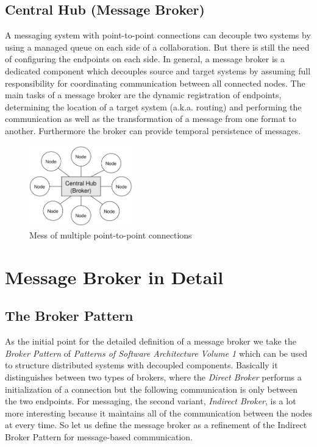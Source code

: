 \subsection{Central Hub (Message Broker)}
\label{intro-messaging-broker}
A messaging system with point-to-point connections can decouple two systems
by using a managed queue on each side of a collaboration. But there is
still the need of configuring the endpoints on each side. In general, a
message broker is a dedicated component which decouples source and
target systems by assuming full responsibility for coordinating communication between
all connected nodes. The main tasks of a message broker are the
dynamic registration of endpoints, determining the location of a target system
(a.k.a. routing) and performing the communication as well as the transformation of a
message from one format to another. Furthermore the broker can provide temporal
persistence of messages. \cite{MSDNIntegration} \\

\begin{figure}[H]
    \centering
    \includegraphics[width=0.4\textwidth]{images/central-hub.png}
    \caption{Mess of multiple point-to-point connections}
    \label{fig:central-hub}
\end{figure}


\section{Message Broker in Detail}
\subsection{The Broker Pattern }
As the initial point for the detailed definition of a message broker we take the
\textit{Broker Pattern} of  \textit{Patterns of Software Architecture Volume 1}
which can be used to structure distributed systems with decoupled components.
Basically it distinguishes between two types of brokers, where the \textit{Direct
Broker} performs a initialization of a connection but the following communication
is only between the two endpoints. For messaging, the second variant,
\textit{Indirect Broker}, is a lot more interesting because it maintains all of
the communication between the nodes at every time. So let us define the message
broker as a refinement of the Indirect Broker Pattern for message-based
communication.\cite{POSA1} 

